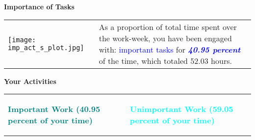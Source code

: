 \documentclass[a4paper]{article}
\begin{document}
\begin{center}
\Large{\textbf{Importance of Tasks}}
 \end{center}
\begin{table}[h!]
     \begin{center}
     \begin{tabular}{m{10cm} m{7cm}}
     \begin {minipage} {10cm}
     \texttt{[image: imp\_act\_s\_plot.jpg]}
     \end{minipage}
      & 
      \begin{minipage}{7cm}
      \Large{As a proportion of total time spent over the work-week, you have been engaged with: \textcolor{blue}{important tasks} for \textbf{\textcolor{blue}{\emph{40.95 percent}}} of the time, which totaled 52.03 hours.}
      \end{minipage}
      \end{tabular}
      \end{center}
      \end{table}

\hrulefill

\newpage

\begin{center}
\huge{\textbf{Your Activities}}
 \end{center}
\begin{table}[h!]
     \begin{center}
     \begin{tabular}{m{7cm} m{1cm} m{7cm}}
     \begin {minipage} {7cm}
          \begin{center}
      \textcolor{teal}{\textbf{\Large{Important Work (40.95 percent of your time)}}}
     \end{center}
     \end{minipage}
      & 
      \begin{minipage}{1cm}
      \end{minipage}
      &
      \begin{minipage}{7cm}
           \begin{center}
      \textcolor{cyan}{\textbf{\Large{Unimportant Work (59.05 percent of your time)}}}
      \end{center} 
      \end{minipage}
      \end{tabular}
      \end{center}
      \end{table}
  \hrulefill
\end{document}

